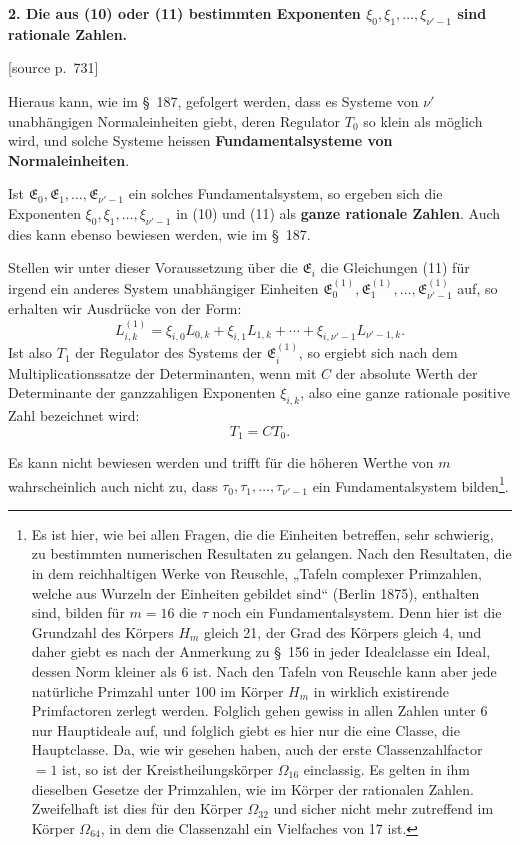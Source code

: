 \documentclass[11pt]{article}
\newcommand{\srcpage}[1]{\par\medskip\noindent\textsf{[source p.~#1]}\par\smallskip}
\begin{document}
\begin{center}\textbf{2. Die aus (10) oder (11) bestimmten Exponenten $\xi_0,\xi_1,\ldots,\xi_{\nu'-1}$ sind rationale Zahlen.}\end{center}

\srcpage{731}
Hieraus kann, wie im \S~187, gefolgert werden, dass es Systeme von $\nu'$ unabhängigen Normaleinheiten giebt, deren Regulator $T_0$ so klein als möglich wird, und solche Systeme heissen \textbf{Fundamentalsysteme von Normaleinheiten}.

Ist $\mathfrak E_0,\mathfrak E_1,\ldots,\mathfrak E_{\nu'-1}$ ein solches Fundamentalsystem, so ergeben sich die Exponenten $\xi_0,\xi_1,\ldots,\xi_{\nu'-1}$ in (10) und (11) als \textbf{ganze rationale Zahlen}. Auch dies kann ebenso bewiesen werden, wie im \S~187.

Stellen wir unter dieser Voraussetzung über die $\mathfrak E_i$ die Gleichungen (11) für irgend ein anderes System unabhängiger Einheiten $\mathfrak E_0^{(1)},\mathfrak E_1^{(1)},\ldots,\mathfrak E_{\nu'-1}^{(1)}$ auf, so erhalten wir Ausdrücke von der Form:
\[
L_{i,k}^{(1)}=\xi_{i,0}L_{0,k}+\xi_{i,1}L_{1,k}+\cdots+\xi_{i,\nu'-1}L_{\nu'-1,k}.
\]
Ist also $T_1$ der Regulator des Systems der $\mathfrak E_i^{(1)}$, so ergiebt sich nach dem Multiplicationssatze der Determinanten, wenn mit $C$ der absolute Werth der Determinante der ganzzahligen Exponenten $\xi_{i,k}$, also eine ganze rationale positive Zahl bezeichnet wird:
\begin{equation}
T_1=CT_0.
\tag{13}
\end{equation}

Es kann nicht bewiesen werden und trifft für die höheren Werthe von $m$ wahrscheinlich auch nicht zu, dass $\tau_0,\tau_1,\ldots,\tau_{\nu'-1}$ ein Fundamentalsystem bilden\footnote{Es ist hier, wie bei allen Fragen, die die Einheiten betreffen, sehr schwierig, zu bestimmten numerischen Resultaten zu gelangen. Nach den Resultaten, die in dem reichhaltigen Werke von Reuschle, „Tafeln complexer Primzahlen, welche aus Wurzeln der Einheiten gebildet sind“ (Berlin 1875), enthalten sind, bilden für $m=16$ die $\tau$ noch ein Fundamentalsystem. Denn hier ist die Grundzahl des Körpers $H_m$ gleich 21, der Grad des Körpers gleich 4, und daher giebt es nach der Anmerkung zu \S~156 in jeder Idealclasse ein Ideal, dessen Norm kleiner als 6 ist. Nach den Tafeln von Reuschle kann aber jede natürliche Primzahl unter 100 im Körper $H_m$ in wirklich existirende Primfactoren zerlegt werden. Folglich gehen gewiss in allen Zahlen unter 6 nur Hauptideale auf, und folglich giebt es hier nur die eine Classe, die Hauptclasse. Da, wie wir gesehen haben, auch der erste Classenzahlfactor $=1$ ist, so ist der Kreistheilungskörper $\Omega_{16}$ einclassig. Es gelten in ihm dieselben Gesetze der Primzahlen, wie im Körper der rationalen Zahlen. Zweifelhaft ist dies für den Körper $\Omega_{32}$ und sicher nicht mehr zutreffend im Körper $\Omega_{64}$, in dem die Classenzahl ein Vielfaches von 17 ist.}.
\end{document}
